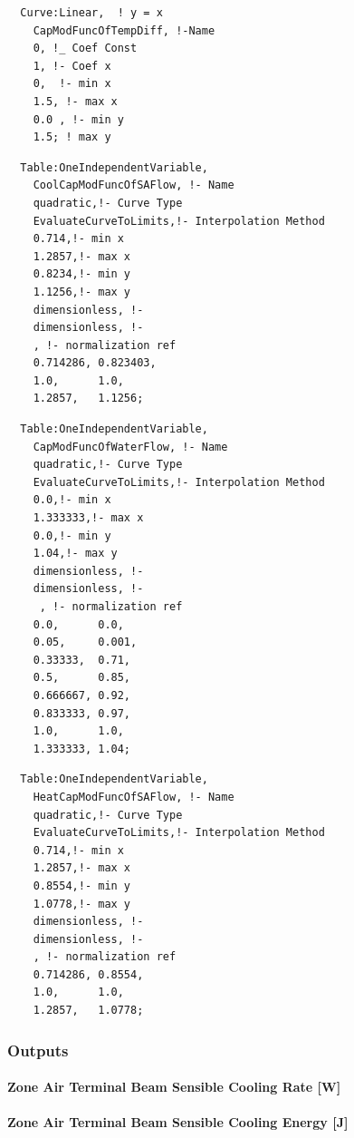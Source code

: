 \begin{lstlisting}
  Curve:Linear,  ! y = x
    CapModFuncOfTempDiff, !-Name
    0, !_ Coef Const
    1, !- Coef x
    0,  !- min x
    1.5, !- max x
    0.0 , !- min y
    1.5; ! max y
\end{lstlisting}

\begin{lstlisting}
  Table:OneIndependentVariable,
    CoolCapModFuncOfSAFlow, !- Name
    quadratic,!- Curve Type
    EvaluateCurveToLimits,!- Interpolation Method
    0.714,!- min x
    1.2857,!- max x
    0.8234,!- min y
    1.1256,!- max y
    dimensionless, !-
    dimensionless, !-
    , !- normalization ref
    0.714286, 0.823403,
    1.0,      1.0,
    1.2857,   1.1256;
\end{lstlisting}

\begin{lstlisting}
  Table:OneIndependentVariable,
    CapModFuncOfWaterFlow, !- Name
    quadratic,!- Curve Type
    EvaluateCurveToLimits,!- Interpolation Method
    0.0,!- min x
    1.333333,!- max x
    0.0,!- min y
    1.04,!- max y
    dimensionless, !-
    dimensionless, !-
     , !- normalization ref
    0.0,      0.0,
    0.05,     0.001,
    0.33333,  0.71,
    0.5,      0.85,
    0.666667, 0.92,
    0.833333, 0.97,
    1.0,      1.0,
    1.333333, 1.04;
\end{lstlisting}

\begin{lstlisting}
  Table:OneIndependentVariable,
    HeatCapModFuncOfSAFlow, !- Name
    quadratic,!- Curve Type
    EvaluateCurveToLimits,!- Interpolation Method
    0.714,!- min x
    1.2857,!- max x
    0.8554,!- min y
    1.0778,!- max y
    dimensionless, !-
    dimensionless, !-
    , !- normalization ref
    0.714286, 0.8554,
    1.0,      1.0,
    1.2857,   1.0778;
\end{lstlisting}

\subsubsection{Outputs}\label{outputs-10}

\paragraph{Zone Air Terminal Beam Sensible Cooling Rate {[}W{]}}\label{zone-air-terminal-beam-sensible-cooling-rate-w}

\paragraph{Zone Air Terminal Beam Sensible Cooling Energy {[}J{]}}\label{zone-air-terminal-beam-sensible-cooling-energy-j}

